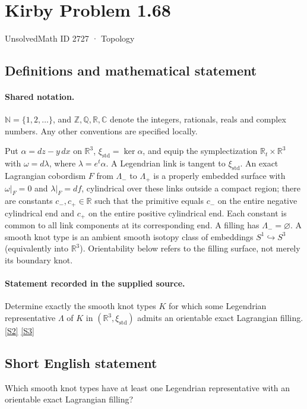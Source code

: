 \documentclass[11pt]{article}
\newcommand{\sref}[2]{\hyperlink{source:#1:#2}{[S#2]}}
\begin{document}
\setcounter{section}{2726}
\section{Kirby Problem 1.68}\label{2727}
{\small\sffamily UnsolvedMath ID 2727 · Topology}
\subsection{Definitions and mathematical statement}

\paragraph{Shared notation.}$\mathbb N=\{1,2,\ldots\}$, and $\mathbb Z,\mathbb Q,\mathbb R,\mathbb C$ denote the integers, rationals, reals and complex numbers. Any other conventions are specified locally.


Put $\alpha=dz-y\,dx$ on $\mathbb R^3$, $\xi_{\mathrm{std}}=\ker\alpha$, and equip the symplectization $\mathbb R_t\times\mathbb R^3$ with $\omega=d\lambda$, where $\lambda=e^t\alpha$. A Legendrian link is tangent to $\xi_{\mathrm{std}}$. An exact Lagrangian cobordism $F$ from $\Lambda_-$ to $\Lambda_+$ is a properly embedded surface with $\omega|_F=0$ and $\lambda|_F=df$, cylindrical over these links outside a compact region; there are constants $c_-,c_+\in\mathbb R$ such that the primitive equals $c_-$ on the entire negative cylindrical end and $c_+$ on the entire positive cylindrical end. Each constant is common to all link components at its corresponding end. A filling has $\Lambda_-=\varnothing$. A smooth knot type is an ambient smooth isotopy class of embeddings $S^1\hookrightarrow S^3$ (equivalently into $\mathbb R^3$). Orientability below refers to the filling surface, not merely its boundary knot.
\paragraph{Statement recorded in the supplied source.}
Determine exactly the smooth knot types $K$ for which some Legendrian representative $\Lambda$ of $K$ in $(\mathbb R^3,\xi_{\mathrm{std}})$ admits an orientable exact Lagrangian filling. \sref{2727}{2} \sref{2727}{3}

\subsection{Short English statement}
Which smooth knot types have at least one Legendrian representative with an orientable exact Lagrangian filling?
\end{document}
